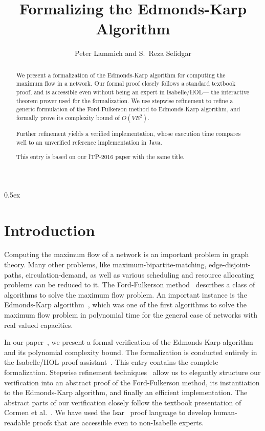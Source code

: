 \documentclass[11pt,a4paper]{article}
\begin{document}
\title{Formalizing the Edmonds-Karp Algorithm}
\author{Peter Lammich and S.~Reza Sefidgar}
\maketitle

\begin{abstract}
We present a formalization of the Edmonds-Karp algorithm for computing the maximum flow in a network.
Our formal proof closely follows a standard textbook proof, and is accessible even without being
an expert in Isabelle/HOL--- the interactive theorem prover used for the formalization.
We use stepwise refinement to refine a generic formulation of the Ford-Fulkerson method to Edmonds-Karp algorithm, 
and formally prove its complexity bound of $O(VE^2)$. 

Further refinement yields a verified implementation, whose execution time compares well to an unverified reference implementation in Java.

This entry is based on our ITP-2016 paper with the same title.
\end{abstract}

\clearpage
\tableofcontents

\clearpage

\parindent 0pt\parskip 0.5ex

\section{Introduction}
Computing the maximum flow of a network is an important problem in graph theory.
Many other problems, like maximum-bipartite-matching, edge-disjoint-paths,
circulation-demand, as well as various scheduling and resource allocating
problems can be reduced to it. The Ford-Fulkerson method~\cite{FF56} describes a
class of algorithms to solve the maximum flow problem. An important instance is
the Edmonds-Karp algorithm~\cite{EK72}, which was one of the first algorithms to
solve the maximum flow problem in polynomial time for the general case of
networks with real valued capacities.

In our paper~\cite{LaSe16}, we present a formal verification of the Edmonds-Karp algorithm
and its polynomial complexity bound. The formalization is conducted entirely in
the Isabelle/HOL proof assistant~\cite{NPW02}. This entry contains the complete formalization.
Stepwise refinement
techniques~\cite{Wirth71,Back78,BaWr98} allow us to elegantly structure our
verification into an abstract proof of the Ford-Fulkerson method, its
instantiation to the Edmonds-Karp algorithm, and finally an efficient
implementation. The abstract parts of our verification closely follow the
textbook presentation of Cormen et al.~\cite{CLRS09}. We have used the
Isar~\cite{Wenzel99} proof language to develop human-readable proofs that are 
accessible even to non-Isabelle experts.
\end{document}
